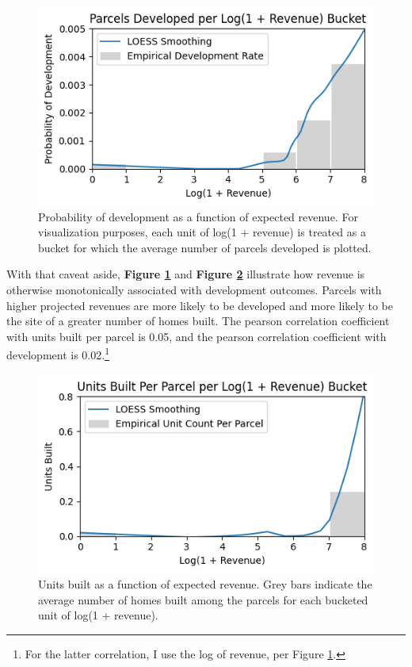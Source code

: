 \documentclass[a4paper,12pt]{article}
\begin{document}
\begin{figure}[hbt]
    \centering
    \includegraphics[scale=.75]{figures/development_vs_revenue.png}
    \caption{Probability of development as a function of expected revenue. For visualization purposes, each unit of log(1 + revenue) is treated as a bucket for which the average number of parcels developed is plotted.}
    \label{fig:development_vs_revenue}
\end{figure}


With that caveat aside, \textbf{Figure \ref{fig:development_vs_revenue}} and \textbf{Figure \ref{fig:production_vs_revenue}} illustrate how revenue is otherwise monotonically associated with development outcomes. Parcels with higher projected revenues are more likely to be developed and more likely to be the site of a greater number of homes built. The pearson correlation coefficient with units built per parcel is 0.05, and the pearson correlation coefficient with development is 0.02.\footnote{For the latter correlation, I use the log of revenue, per Figure \ref{fig:development_vs_revenue}.}

\begin{figure}[hbt]
    \centering
    \includegraphics[scale=.75]{figures/production_vs_revenue.png}
    \caption{Units built as a function of expected revenue. Grey bars indicate the average number of homes built among the parcels for each bucketed unit of log(1 + revenue).}
    \label{fig:production_vs_revenue}
\end{figure}
\end{document}
